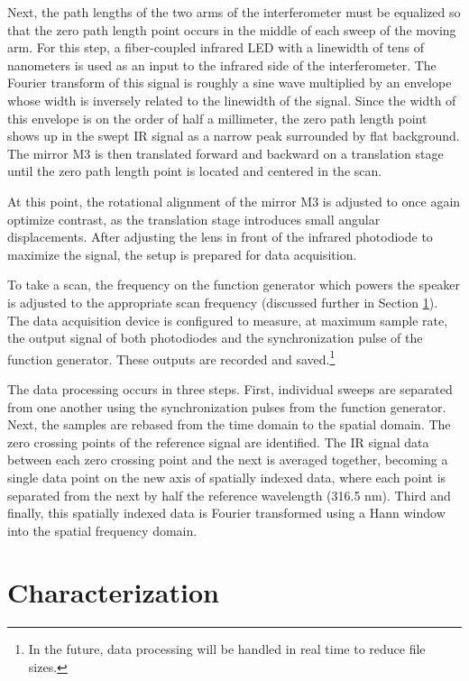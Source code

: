 \documentclass[12pt]{puthesis}
\begin{document}
Next, the path lengths of the two arms of the interferometer must be equalized so that the zero path length point occurs in the middle of each sweep of the moving arm. For this step, a fiber-coupled infrared LED with a linewidth of tens of nanometers is used as an input to the infrared side of the interferometer. The Fourier transform of this signal is roughly a sine wave multiplied by an envelope whose width is inversely related to the linewidth of the signal. Since the width of this envelope is on the order of half a millimeter, the zero path length point shows up in the swept IR signal as a narrow peak surrounded by flat background. The mirror M3 is then translated forward and backward on a translation stage until the zero path length point is located and centered in the scan.

At this point, the rotational alignment of the mirror M3 is adjusted to once again optimize contrast, as the translation stage introduces small angular displacements. After adjusting the lens in front of the infrared photodiode to maximize the signal, the setup is prepared for data acquisition.

To take a scan, the frequency on the function generator which powers the speaker is adjusted to the appropriate scan frequency (discussed further in Section \ref{sec:characterization}). The data acquisition device is configured to measure, at maximum sample rate, the output signal of both photodiodes and the synchronization pulse of the function generator. These outputs are recorded and saved.\footnote{In the future, data processing will be handled in real time to reduce file sizes.}

The data processing occurs in three steps. First, individual sweeps are separated from one another using the synchronization pulses from the function generator. Next, the samples are rebased from the time domain to the spatial domain. The zero crossing points of the reference signal are identified. The IR signal data between each zero crossing point and the next is averaged together, becoming a single data point on the new axis of spatially indexed data, where each point is separated from the next by half the reference wavelength (316.5 nm). Third and finally, this spatially indexed data is Fourier transformed using a Hann window into the spatial frequency domain. 

\section{Characterization}
\label{sec:characterization}
\end{document}
